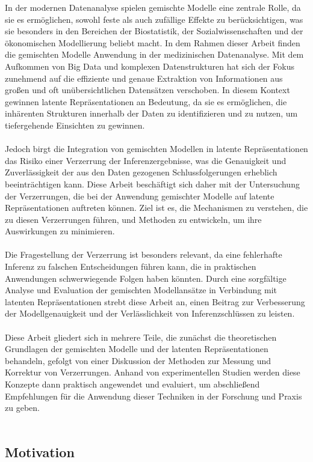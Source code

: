 \documentclass[%
thesis=student,%
coverpage=false,%
titlepage=false,%
headmarks=true, %
german,%
font=libertine, %
math=newpxtx, %
BCOR=5mm,%
coverBCOR=11mm%
]{tumbook}
\theoremstyle{break}
\begin{document}
In der modernen Datenanalyse spielen gemischte Modelle eine zentrale Rolle, da sie es ermöglichen, sowohl feste als auch zufällige Effekte zu berücksichtigen, was sie besonders in den Bereichen der Biostatistik, der Sozialwissenschaften und der ökonomischen Modellierung beliebt macht. In dem Rahmen dieser Arbeit finden die gemischten Modelle Anwendung in der medizinischen Datenanalyse. Mit dem Aufkommen von Big Data und komplexen Datenstrukturen hat sich der Fokus zunehmend auf die effiziente und genaue Extraktion von Informationen aus großen und oft unübersichtlichen Datensätzen verschoben. In diesem Kontext gewinnen latente Repräsentationen an Bedeutung, da sie es ermöglichen, die inhärenten Strukturen innerhalb der Daten zu identifizieren und zu nutzen, um tiefergehende Einsichten zu gewinnen.\\
\\
Jedoch birgt die Integration von gemischten Modellen in latente Repräsentationen das Risiko einer Verzerrung der Inferenzergebnisse, was die Genauigkeit und Zuverlässigkeit der aus den Daten gezogenen Schlussfolgerungen erheblich beeinträchtigen kann. Diese Arbeit beschäftigt sich daher mit der Untersuchung der Verzerrungen, die bei der Anwendung gemischter Modelle auf latente Repräsentationen auftreten können. Ziel ist es, die Mechanismen zu verstehen, die zu diesen Verzerrungen führen, und Methoden zu entwickeln, um ihre Auswirkungen zu minimieren.\\
\\
Die Fragestellung der Verzerrung ist besonders relevant, da eine fehlerhafte Inferenz zu falschen Entscheidungen führen kann, die in praktischen Anwendungen schwerwiegende Folgen haben könnten. Durch eine sorgfältige Analyse und Evaluation der gemischten Modellansätze in Verbindung mit latenten Repräsentationen strebt diese Arbeit an, einen Beitrag zur Verbesserung der Modellgenauigkeit und der Verlässlichkeit von Inferenzschlüssen zu leisten.\\
\\
Diese Arbeit gliedert sich in mehrere Teile, die zunächst die theoretischen Grundlagen der gemischten Modelle und der latenten Repräsentationen behandeln, gefolgt von einer Diskussion der Methoden zur Messung und Korrektur von Verzerrungen. Anhand von experimentellen Studien werden diese Konzepte dann praktisch angewendet und evaluiert, um abschließend Empfehlungen für die Anwendung dieser Techniken in der Forschung und Praxis zu geben.\\
\\
\subsection{Motivation}
\end{document}
